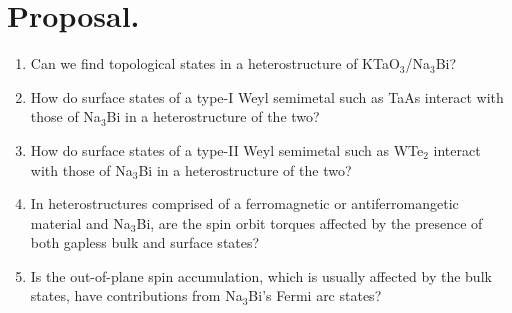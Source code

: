 \documentclass[english]{revtex4-1}
\begin{document}
\section{Proposal.}

\begin{enumerate}
    
    \item Can we find topological states in a heterostructure of KTaO$_3$/Na$_3$Bi?
    
    \item  How do surface states of a type-I Weyl semimetal such as TaAs interact with those of Na$_3$Bi in a heterostructure of the two?  
    
    \item  How do surface states of a type-II Weyl semimetal such as WTe$_2$ interact with those of Na$_3$Bi in a heterostructure of the two?  
    
    \item In heterostructures comprised of a ferromagnetic or antiferromangetic material and Na$_3$Bi, are the spin orbit torques affected by the presence of both gapless bulk and surface states?
    
    \item Is the out-of-plane spin accumulation, which is usually affected by the bulk states, have contributions from Na$_3$Bi's  Fermi arc states?
    
\end{enumerate}


\medskip

\printbibliography
\end{document}
